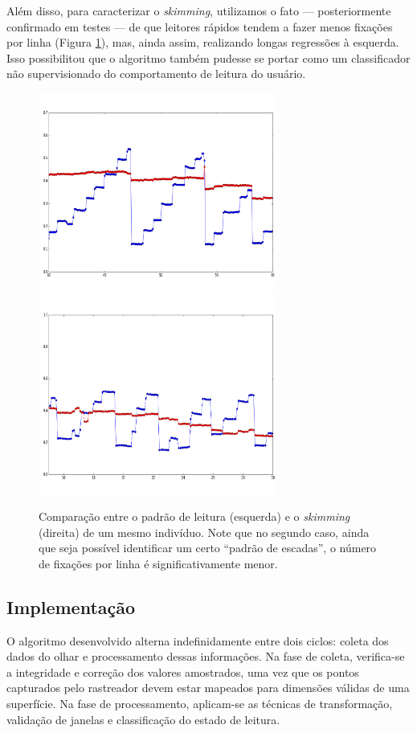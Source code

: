 \documentclass[12pt]{article}
\begin{document}
		Além disso, para caracterizar o \textit{skimming}, utilizamos o fato --- posteriormente confirmado em testes --- de que leitores rápidos tendem a fazer menos fixações por linha (Figura \ref{fig:skimming}), mas, ainda assim, realizando longas regressões à esquerda. Isso possibilitou que o algoritmo também pudesse se portar como um classificador não supervisionado do comportamento de leitura do usuário.
		
		\begin{figure}[!ht]
			\centering
			\includegraphics[width=7.8cm]{imgs/leitura_skimming1.png}
			\includegraphics[width=7.8cm]{imgs/leitura_skimming2.png}
			\caption{\footnotesize {Comparação entre o padrão de leitura (esquerda) e o \textit{skimming} (direita) de um mesmo indivíduo. Note que no segundo caso, ainda que seja possível identificar um certo ``padrão de escadas'', o número de fixações por linha é significativamente menor.}}
			\label{fig:skimming}
			\vspace{5mm}
		\end{figure}
		
		
		\subsection{Implementação}
		O algoritmo desenvolvido alterna indefinidamente entre dois ciclos: coleta dos dados do olhar e processamento dessas informações. Na fase de coleta, verifica-se a integridade e correção dos valores amostrados, uma vez que os pontos capturados pelo rastreador devem estar mapeados para dimensões válidas de uma superfície. Na fase de processamento, aplicam-se as técnicas de transformação, validação de janelas e classificação do estado de leitura.
		
\end{document}
